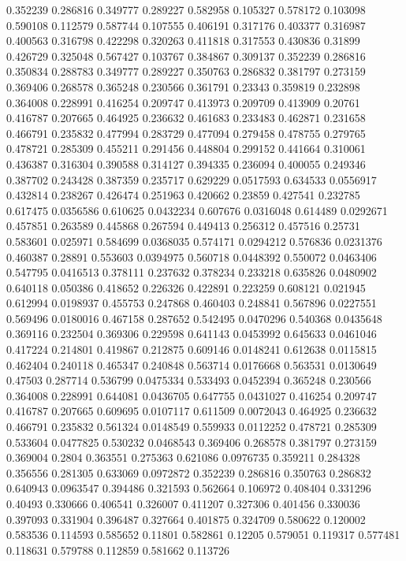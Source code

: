 0.352239 0.286816
0.349777 0.289227
0.582958 0.105327
0.578172 0.103098
0.590108 0.112579
0.587744 0.107555
0.406191 0.317176
0.403377 0.316987
0.400563 0.316798
0.422298 0.320263
0.411818 0.317553
0.430836 0.31899
0.426729 0.325048
0.567427 0.103767
0.384867 0.309137
0.352239 0.286816
0.350834 0.288783
0.349777 0.289227
0.350763 0.286832
0.381797 0.273159
0.369406 0.268578
0.365248 0.230566
0.361791 0.23343
0.359819 0.232898
0.364008 0.228991
0.416254 0.209747
0.413973 0.209709
0.413909 0.20761
0.416787 0.207665
0.464925 0.236632
0.461683 0.233483
0.462871 0.231658
0.466791 0.235832
0.477994 0.283729
0.477094 0.279458
0.478755 0.279765
0.478721 0.285309
0.455211 0.291456
0.448804 0.299152
0.441664 0.310061
0.436387 0.316304
0.390588 0.314127
0.394335 0.236094
0.400055 0.249346
0.387702 0.243428
0.387359 0.235717
0.629229 0.0517593
0.634533 0.0556917
0.432814 0.238267
0.426474 0.251963
0.420662 0.23859
0.427541 0.232785
0.617475 0.0356586
0.610625 0.0432234
0.607676 0.0316048
0.614489 0.0292671
0.457851 0.263589
0.445868 0.267594
0.449413 0.256312
0.457516 0.25731
0.583601 0.025971
0.584699 0.0368035
0.574171 0.0294212
0.576836 0.0231376
0.460387 0.28891
0.553603 0.0394975
0.560718 0.0448392
0.550072 0.0463406
0.547795 0.0416513
0.378111 0.237632
0.378234 0.233218
0.635826 0.0480902
0.640118 0.050386
0.418652 0.226326
0.422891 0.223259
0.608121 0.021945
0.612994 0.0198937
0.455753 0.247868
0.460403 0.248841
0.567896 0.0227551
0.569496 0.0180016
0.467158 0.287652
0.542495 0.0470296
0.540368 0.0435648
0.369116 0.232504
0.369306 0.229598
0.641143 0.0453992
0.645633 0.0461046
0.417224 0.214801
0.419867 0.212875
0.609146 0.0148241
0.612638 0.0115815
0.462404 0.240118
0.465347 0.240848
0.563714 0.0176668
0.563531 0.0130649
0.47503 0.287714
0.536799 0.0475334
0.533493 0.0452394
0.365248 0.230566
0.364008 0.228991
0.644081 0.0436705
0.647755 0.0431027
0.416254 0.209747
0.416787 0.207665
0.609695 0.0107117
0.611509 0.0072043
0.464925 0.236632
0.466791 0.235832
0.561324 0.0148549
0.559933 0.0112252
0.478721 0.285309
0.533604 0.0477825
0.530232 0.0468543
0.369406 0.268578
0.381797 0.273159
0.369004 0.2804
0.363551 0.275363
0.621086 0.0976735
0.359211 0.284328
0.356556 0.281305
0.633069 0.0972872
0.352239 0.286816
0.350763 0.286832
0.640943 0.0963547
0.394486 0.321593
0.562664 0.106972
0.408404 0.331296
0.40493 0.330666
0.406541 0.326007
0.411207 0.327306
0.401456 0.330036
0.397093 0.331904
0.396487 0.327664
0.401875 0.324709
0.580622 0.120002
0.583536 0.114593
0.585652 0.11801
0.582861 0.12205
0.579051 0.119317
0.577481 0.118631
0.579788 0.112859
0.581662 0.113726
